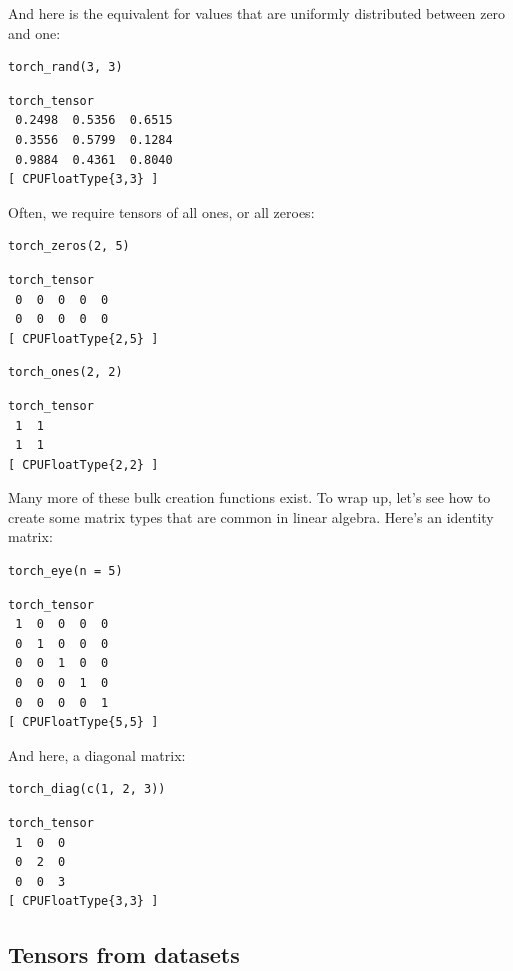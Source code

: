 \documentclass[
  letterpaper,
]{krantz}
\begin{document}
And here is the equivalent for values that are uniformly distributed
between zero and one:

\begin{verbatim}
torch_rand(3, 3)
\end{verbatim}

\begin{verbatim}
torch_tensor
 0.2498  0.5356  0.6515
 0.3556  0.5799  0.1284
 0.9884  0.4361  0.8040
[ CPUFloatType{3,3} ]
\end{verbatim}

Often, we require tensors of all ones, or all zeroes:

\begin{verbatim}
torch_zeros(2, 5)
\end{verbatim}

\begin{verbatim}
torch_tensor
 0  0  0  0  0
 0  0  0  0  0
[ CPUFloatType{2,5} ]
\end{verbatim}

\begin{verbatim}
torch_ones(2, 2)
\end{verbatim}

\begin{verbatim}
torch_tensor
 1  1
 1  1
[ CPUFloatType{2,2} ]
\end{verbatim}

Many more of these bulk creation functions exist. To wrap up, let's see
how to create some matrix types that are common in linear algebra.
Here's an identity matrix:

\begin{verbatim}
torch_eye(n = 5)
\end{verbatim}

\begin{verbatim}
torch_tensor
 1  0  0  0  0
 0  1  0  0  0
 0  0  1  0  0
 0  0  0  1  0
 0  0  0  0  1
[ CPUFloatType{5,5} ]
\end{verbatim}

And here, a diagonal matrix:

\begin{verbatim}
torch_diag(c(1, 2, 3))
\end{verbatim}

\begin{verbatim}
torch_tensor
 1  0  0
 0  2  0
 0  0  3
[ CPUFloatType{3,3} ]
\end{verbatim}

\hypertarget{tensors-from-datasets}{%
\subsection{\texorpdfstring{Tensors from
datasets}{Tensors from datasets}}\label{tensors-from-datasets}}
\end{document}
